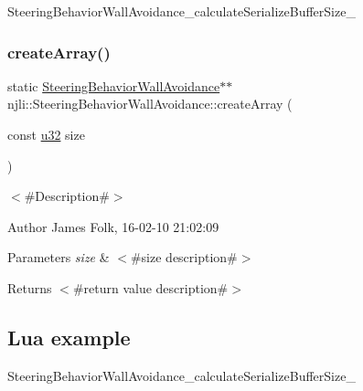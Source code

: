 \begin{DoxyCodeInclude}
\end{DoxyCodeInclude}
Steering\+Behavior\+Wall\+Avoidance\+\_\+calculate\+Serialize\+Buffer\+Size\+\_\+ \mbox{\label{classnjli_1_1_steering_behavior_wall_avoidance_a484146269c83bea7aa24c1bd454c53b6}} 
\subsubsection{\texorpdfstring{create\+Array()}{createArray()}}
{\footnotesize\ttfamily static \mbox{\hyperlink{classnjli_1_1_steering_behavior_wall_avoidance}{Steering\+Behavior\+Wall\+Avoidance}}$\ast$$\ast$ njli\+::\+Steering\+Behavior\+Wall\+Avoidance\+::create\+Array (\begin{DoxyParamCaption}\item[{const \mbox{\hyperlink{_util_8h_a10e94b422ef0c20dcdec20d31a1f5049}{u32}}}]{size }\end{DoxyParamCaption})\hspace{0.3cm}{\ttfamily [static]}}



$<$\#\+Description\#$>$ 

\begin{DoxyAuthor}{Author}
James Folk, 16-\/02-\/10 21\+:02\+:09
\end{DoxyAuthor}

\begin{DoxyParams}{Parameters}
{\em size} & $<$\#size description\#$>$\\
\hline
\end{DoxyParams}
\begin{DoxyReturn}{Returns}
$<$\#return value description\#$>$
\end{DoxyReturn}
\hypertarget{classnjli_1_1_steering_behavior_wander_ex1}{}\subsection{Lua example}\label{classnjli_1_1_steering_behavior_wander_ex1}

\begin{DoxyCodeInclude}
\end{DoxyCodeInclude}
Steering\+Behavior\+Wall\+Avoidance\+\_\+calculate\+Serialize\+Buffer\+Size\+\_\+ \mbox{\label{classnjli_1_1_steering_behavior_wall_avoidance_af95d1f2642c824237b27c65e5526d7f5}} 
